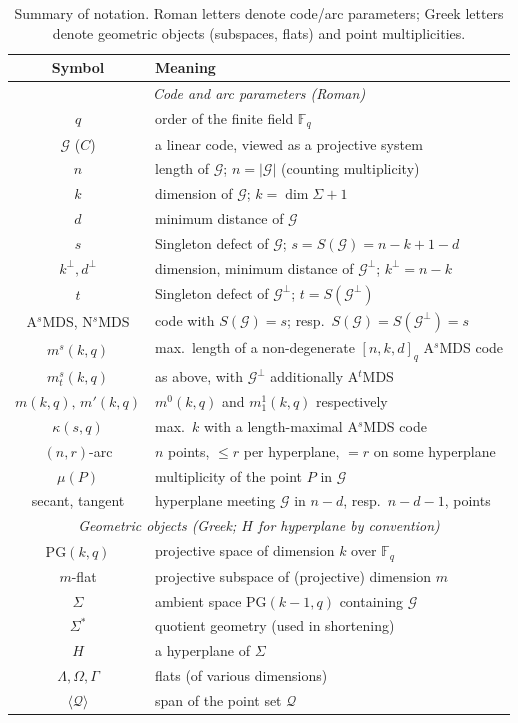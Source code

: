 \documentclass[11pt,a4paper]{amsart}
\newcommand{\F}{\mathbb{F}}
\newcommand{\G}{\mathcal{G}}
\theoremstyle{plain}
\theoremstyle{definition}
\theoremstyle{remark}
\begin{document}
\begin{table}[h]
	\centering
	\caption{Summary of notation. Roman letters denote code/arc parameters;
		Greek letters denote geometric objects (subspaces, flats) and point
		multiplicities.}\label{table: notation}
	\begin{tabular}{|c|l|}
		\hline
		Symbol & Meaning \\ \hline\hline
		\multicolumn{2}{|c|}{\emph{Code and arc parameters (Roman)}}\\ \hline
		$q$ & order of the finite field $\F_q$ \\ \hline
		$\G$ ($C$) & a linear code, viewed as a projective system \\ \hline
		$n$ & length of $\G$; $n=|\G|$ (counting multiplicity) \\ \hline
		$k$ & dimension of $\G$; $k=\dim\Sigma+1$ \\ \hline
		$d$ & minimum distance of $\G$ \\ \hline
		$s$ & Singleton defect of $\G$; $s=S(\G)=n-k+1-d$ \\ \hline
		$k^\perp,d^\perp$ & dimension, minimum distance of $\G^\perp$; $k^\perp=n-k$ \\ \hline
		$t$ & Singleton defect of $\G^\perp$; $t=S(\G^\perp)$ \\ \hline
		A$^s$MDS, N$^s$MDS & code with $S(\G)=s$; resp.\ $S(\G)=S(\G^\perp)=s$ \\ \hline
		$m^s(k,q)$ & max.\ length of a non-degenerate $[n,k,d]_q$ A$^s$MDS code \\ \hline
		$m^s_t(k,q)$ & as above, with $\G^\perp$ additionally A$^t$MDS \\ \hline
		$m(k,q),\,m'(k,q)$ & $m^0(k,q)$ and $m^1_1(k,q)$ respectively \\ \hline
		$\kappa(s,q)$ & max.\ $k$ with a length-maximal A$^s$MDS code \\ \hline
		$(n,r)$-arc & $n$ points, $\le r$ per hyperplane, $=r$ on some hyperplane \\ \hline
		$\mu(P)$ & multiplicity of the point $P$ in $\G$ \\ \hline
		secant, tangent & hyperplane meeting $\G$ in $n-d$, resp.\ $n-d-1$, points \\ \hline\hline
		\multicolumn{2}{|c|}{\emph{Geometric objects (Greek; $H$ for hyperplane by convention)}}\\ \hline
		PG$(k,q)$ & projective space of dimension $k$ over $\F_q$ \\ \hline
		$m$-flat & projective subspace of (projective) dimension $m$ \\ \hline
		$\Sigma$ & ambient space PG$(k-1,q)$ containing $\G$ \\ \hline
		$\Sigma^*$ & quotient geometry (used in shortening) \\ \hline
		$H$ & a hyperplane of $\Sigma$ \\ \hline
		$\Lambda,\Omega,\Gamma$ & flats (of various dimensions) \\ \hline
		$\langle\mathcal{Q}\rangle$ & span of the point set $\mathcal{Q}$ \\ \hline
	\end{tabular}
\end{table}
\end{document}
